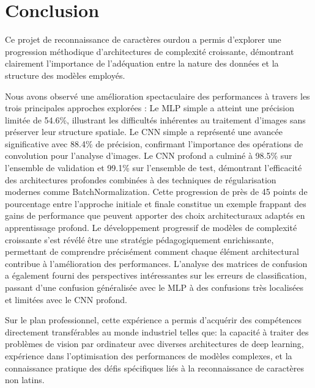 \clearpage
\chapter*{Conclusion}
\vspace{-1cm}

\begin{flushleft}
Ce projet de reconnaissance de caractères ourdou a permis d'explorer une progression méthodique d'architectures de complexité croissante, démontrant clairement l'importance de l'adéquation entre la nature des données et la structure des modèles employés.

\bigskip

Nous avons observé une amélioration spectaculaire des performances à travers les trois principales approches explorées :
Le MLP simple a atteint une précision limitée de 54.6\%, illustrant les difficultés inhérentes au traitement d'images sans préserver leur structure spatiale. Le CNN simple a représenté une avancée significative avec 88.4\% de précision, confirmant l'importance des opérations de convolution pour l'analyse d'images. Le CNN profond a culminé à 98.5\% sur l'ensemble de validation et 99.1\% sur l'ensemble de test, démontrant l'efficacité des architectures profondes combinées à des techniques de régularisation modernes comme BatchNormalization.\newline
Cette progression de près de 45 points de pourcentage entre l'approche initiale et finale constitue un exemple frappant des gains de performance que peuvent apporter des choix architecturaux adaptés en apprentissage profond.\newline
Le développement progressif de modèles de complexité croissante s'est révélé être une stratégie pédagogiquement enrichissante, permettant de comprendre précisément comment chaque élément architectural contribue à l'amélioration des performances. L'analyse des matrices de confusion a également fourni des perspectives intéressantes sur les erreurs de classification, passant d'une confusion généralisée avec le MLP à des confusions très localisées et limitées avec le CNN profond. \newline

Sur le plan professionnel, cette expérience a permis d'acquérir des compétences directement transférables au monde industriel telles que: la capacité à traiter des problèmes de vision par ordinateur avec diverses architectures de deep learning, expérience dans l'optimisation des performances de modèles complexes, et la connaissance pratique des défis spécifiques liés à la reconnaissance de caractères non latins.\newline
 

\end{flushleft}
